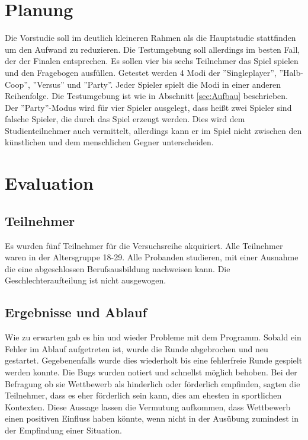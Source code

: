 \section{Planung}
Die Vorstudie soll im deutlich kleineren Rahmen als die Hauptstudie stattfinden um den Aufwand zu reduzieren. Die Testumgebung soll allerdings im besten Fall, der der Finalen  entsprechen. Es sollen vier bis sechs Teilnehmer das Spiel spielen und den Fragebogen ausfüllen. Getestet werden 4 Modi der ''Singleplayer'', ''Halb-Coop'', ''Versus'' und ''Party''. Jeder Spieler spielt die Modi in einer anderen Reihenfolge. Die Testumgebung ist wie in Abschnitt \ref{sec:Aufbau} beschrieben. Der ''Party''-Modus wird für vier Spieler ausgelegt, dass heißt zwei Spieler sind falsche Spieler, die durch das Spiel erzeugt werden. Dies wird dem Studienteilnehmer auch vermittelt, allerdings kann er im Spiel nicht zwischen den künstlichen und dem menschlichen Gegner unterscheiden.
\section{Evaluation}
\subsection{Teilnehmer}
Es wurden fünf Teilnehmer für die Versuchsreihe akquiriert. Alle Teilnehmer waren  in der Altersgruppe 18-29. Alle Probanden studieren, mit einer Ausnahme die eine abgeschlossen Berufsausbildung nachweisen kann. Die Geschlechteraufteilung ist nicht ausgewogen.
\subsection{Ergebnisse und Ablauf}
Wie zu erwarten gab es hin und wieder Probleme mit dem Programm. Sobald ein Fehler im Ablauf aufgetreten ist, wurde die Runde abgebrochen und neu gestartet. Gegebenenfalls wurde dies wiederholt bis eine fehlerfreie Runde gespielt werden konnte. Die Bugs wurden notiert und schnellst möglich behoben.\newline
Bei der Befragung ob sie Wettbewerb als hinderlich oder förderlich empfinden, sagten die Teilnehmer, dass es eher förderlich sein kann, dies am ehesten in sportlichen Kontexten. Diese Aussage lassen die Vermutung aufkommen, dass Wettbewerb einen positiven Einfluss haben könnte, wenn nicht in der Ausübung zumindest in der Empfindung einer Situation.%




